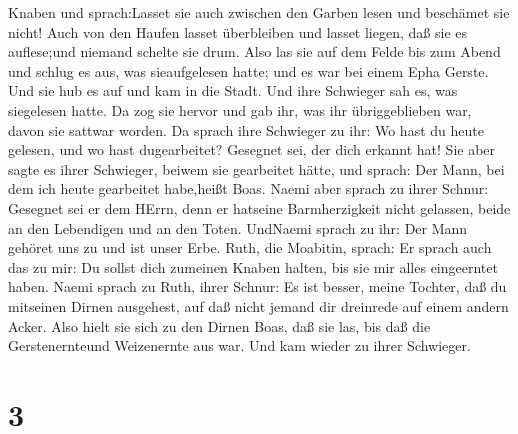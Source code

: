 Knaben und sprach:Lasset sie auch zwischen den Garben lesen und
beschämet sie nicht!  Auch von den Haufen lasset
überbleiben und lasset liegen, daß sie es auflese;und niemand schelte
sie drum.  Also las sie auf dem Felde bis zum Abend und
schlug es aus, was sieaufgelesen hatte; und es war bei einem Epha
Gerste.  Und sie hub es auf und kam in die Stadt. Und ihre
Schwieger sah es, was siegelesen hatte. Da zog sie hervor und gab ihr,
was ihr übriggeblieben war, davon sie sattwar worden.  Da
sprach ihre Schwieger zu ihr: Wo hast du heute gelesen, und wo hast
dugearbeitet? Gesegnet sei, der dich erkannt hat! Sie aber sagte es
ihrer Schwieger, beiwem sie gearbeitet hätte, und sprach: Der Mann, bei
dem ich heute gearbeitet habe,heißt Boas.  Naemi aber
sprach zu ihrer Schnur: Gesegnet sei er dem HErrn, denn er hatseine
Barmherzigkeit nicht gelassen, beide an den Lebendigen und an den Toten.
UndNaemi sprach zu ihr: Der Mann gehöret uns zu und ist unser Erbe.
 Ruth, die Moabitin, sprach: Er sprach auch das zu mir: Du
sollst dich zumeinen Knaben halten, bis sie mir alles eingeerntet haben.
 Naemi sprach zu Ruth, ihrer Schnur: Es ist besser, meine
Tochter, daß du mitseinen Dirnen ausgehest, auf daß nicht jemand dir
dreinrede auf einem andern Acker.  Also hielt sie sich zu
den Dirnen Boas, daß sie las, bis daß die Gerstenernteund Weizenernte
aus war. Und kam wieder zu ihrer Schwieger.

\hypertarget{section-2}{%
\section{3}\label{section-2}}

